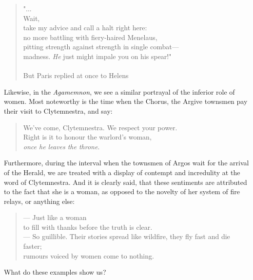 \begin{quote}
    "... \\
    Wait, \\
    take my advice and call a halt right here: \\
    no more battling with fiery-haired Menelaus, \\
    pitting strength against strength in single combat---\\
    madness. \emph{He} just might impale you on his spear!" \\
    \\
    But Paris replied at once to Helens
\end{quote}

Likewise, in the \textit{Agamemnon}, we see a similar portrayal of the inferior
role of women. Most noteworthy is the time when the Chorus, the Argive townsmen
pay their visit to Clytemnestra, and say:

\begin{quote}
    We've come, Clytemnestra. We respect your power. \\
    Right is it to honour the warlord's woman, \\
    \textit{once he leaves the throne}. \\
    \autocite[258]{fagles}
\end{quote}

\noindent Furthermore, during the interval when the townsmen of Argos wait for
the arrival of the Herald, we are treated with a display of contempt and
incredulity at the word of Clytemnestra. And it is clearly said, that these
sentiments are attributed to the fact that she is a woman, as opposed to the
novelty of her system of fire relays, or anything else:

\begin{quote}
    --- Just like a woman \\
    to fill with thanks before the truth is clear. \\
    --- So guillible. Their stories spread like wildfire, they fly fast and die faster; \\
    rumours voiced by women come to nothing. \\
    \autocite[470]{fagles}
\end{quote}

What do these examples show us?
